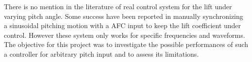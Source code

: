 \par There is no mention in the literature of real control system for the lift under varying pitch angle.
Some success have been reported in manually synchronizing a sinusoidal pitching motion with a AFC input to keep the lift coefficient under control. 
However these system only works for specific frequencies and waveforms. 
The objective for this project was to investigate the possible performances of such a controller for arbitrary pitch input and to assess its limitations.



